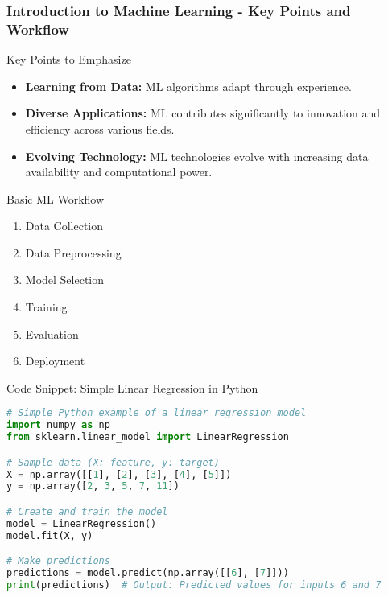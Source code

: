 \documentclass[aspectratio=169]{beamer}
\begin{document}
\begin{frame}[fragile]
    \frametitle{Introduction to Machine Learning - Key Points and Workflow}
    
    \begin{block}{Key Points to Emphasize}
        \begin{itemize}
            \item \textbf{Learning from Data:} ML algorithms adapt through experience.
            \item \textbf{Diverse Applications:} ML contributes significantly to innovation and efficiency across various fields.
            \item \textbf{Evolving Technology:} ML technologies evolve with increasing data availability and computational power.
        \end{itemize}
    \end{block}
    
    \begin{block}{Basic ML Workflow}
        \begin{enumerate}
            \item Data Collection
            \item Data Preprocessing
            \item Model Selection
            \item Training
            \item Evaluation
            \item Deployment
        \end{enumerate}
    \end{block}
    
    \begin{block}{Code Snippet: Simple Linear Regression in Python}
        \begin{lstlisting}[language=Python]
# Simple Python example of a linear regression model
import numpy as np
from sklearn.linear_model import LinearRegression

# Sample data (X: feature, y: target)
X = np.array([[1], [2], [3], [4], [5]])
y = np.array([2, 3, 5, 7, 11])

# Create and train the model
model = LinearRegression()
model.fit(X, y)

# Make predictions
predictions = model.predict(np.array([[6], [7]]))
print(predictions)  # Output: Predicted values for inputs 6 and 7
        \end{lstlisting}
    \end{block}
\end{frame}
\end{document}
